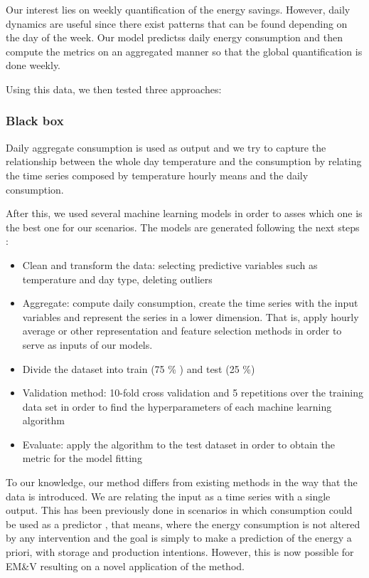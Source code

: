 \documentclass[10pt, conference, compsocconf]{IEEEtran}
\begin{document}
Our interest lies on weekly quantification of the energy savings. However, daily dynamics are useful since there exist patterns that can be found depending on the day of the week. Our model predictss daily energy consumption and then compute the metrics on an aggregated manner so that the global quantification is done weekly.

Using this data, we then tested three approaches:

\subsubsection{Black box}

Daily aggregate consumption is used as output and we try to capture the relationship between the whole day temperature and the consumption by relating the time series composed by temperature hourly means and the daily consumption.

After this, we used several machine learning models in order to asses which one is the best one for our scenarios. The models are generated  following the next steps \cite{gonzalez2016towards}:

\begin{itemize}
\item Clean and transform the data: selecting predictive variables such as temperature and day type, deleting outliers 
\item Aggregate: compute daily consumption, create the time series with the input variables and represent the series in a lower dimension. That is, apply hourly average or other representation and feature selection methods in order to serve as inputs of our models.
\item Divide the dataset into train (75 \% ) and test (25 \%)
\item Validation method: 10-fold cross validation and 5 repetitions over the training data set in order to find the hyperparameters of each machine learning algorithm
\item Evaluate: apply the algorithm to the test dataset in order to obtain the metric for the model fitting
\end{itemize}


To our knowledge, our method differs from existing methods in the way that the data is introduced. We are relating the input as a time series with a single output. This has been previously done in scenarios in which consumption could be used as a predictor \cite{ruijin2013building}, that means, where the energy consumption is not altered by any intervention and the goal is simply to make a prediction of the energy a priori, with storage and production intentions. However, this is now possible for EM\&V resulting on a novel application of the method.
\end{document}
